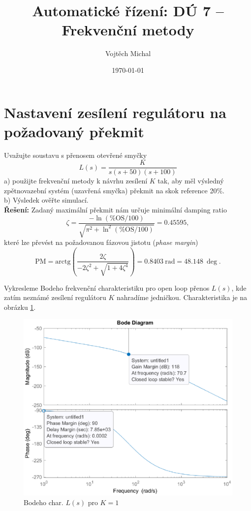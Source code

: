 \documentclass[twoside]{article}
\title{Automatické řízení: DÚ 7 -- Frekvenční metody}
\author{Vojtěch Michal}
\date{\today}
\begin{document}
\maketitle

\section{Nastavení zesílení regulátoru na požadovaný překmit}
Uvažujte soustavu s přenosem otevřené smyčky
\begin{equation}
	L(s) = \frac{K}{s(s+50)(s+100)}
\end{equation}
a) použijte frekvenční metody k návrhu zesílení $K$ tak, aby měl výsledný zpětnovazební systém
(uzavřená smyčka) překmit na skok reference 20\%. \\
b) Výsledek ověřte simulací. \\
\textbf{Řešení:}
Zadaný maximální překmit nám určuje minimální damping ratio
\begin{equation}
	\zeta = \frac{-\ln(\text{\%OS}/100)}{\sqrt{\pi^2 + \ln^2(\text{\%OS}/100)}} = 0.45595,
\end{equation}
které lze převést na požadovanou fázovou jistotu (\textit{phase margin})
\begin{equation}
	\text{PM} = \text{arctg} \left( \frac{ 2 \zeta}{-2\zeta^2 + \sqrt{1 + 4 \zeta^4}} \right) = 0.8403~\text{rad} = 48.148~\deg.
\end{equation}

Vykresleme Bodeho frekvenční charakteristiku pro open loop přenos $L(s)$, kde zatím neznámé zesílení regulátoru $K$
nahradíme jedničkou. Charakteristika je na obrázku \ref{fig:bode_unity_gain}.

\begin{figure}[htbp]
	\centering
	\includegraphics[width=0.65\linewidth]{bode_unity_gain.eps}
	\caption{Bodeho char. $L(s)$ pro $K=1$}
	\label{fig:bode_unity_gain}
\end{figure}
\end{document}
